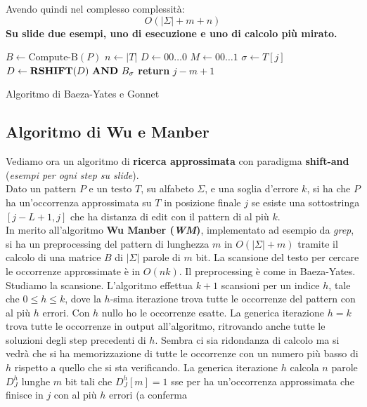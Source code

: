 \documentclass[a4paper,12pt, oneside]{book}
\begin{document}
Avendo quindi nel complesso complessità:
\[O(|\Sigma|+m+n)\]
\textbf{Su slide due esempi, uno di esecuzione e uno di calcolo più mirato.}
\begin{algorithm}
  \begin{algorithmic}
    \State $B\gets \mbox{Compute-B}(P)$
    \State $n\gets |T|$
    \State $D\gets 00\ldots 0$
    \State $M\gets 00\ldots 1$
    \State $\sigma\gets T[j]$
    \State $D\gets \mathbf{RSHIFT}(D)\mbox{ \textbf{AND} }B_\sigma$
    \State \textbf{return} $j-m+1$
    \EndIf
    \EndFor
    \EndFunction
  \end{algorithmic}
  \caption{Algoritmo di Baeza-Yates e Gonnet}
\end{algorithm}
\subsection{Algoritmo di Wu e Manber}
Vediamo ora un algoritmo di \textbf{ricerca approssimata} con paradigma
\textbf{shift-and} (\textit{esempi per ogni step su slide}).\\
Dato un pattern $P$ e un testo $T$, su alfabeto $\Sigma$, e una soglia d'errore
$k$, si ha che $P$ ha un'occorrenza approssimata su $T$ in posizione finale $j$
se esiste una sottostringa $[j-L+1,j]$ che ha distanza di edit con il pattern di
al più $k$.\\
In merito all'algoritmo \textbf{Wu Manber (\textit{WM})}, implementato ad
esempio da \textit{grep}, si ha un preprocessing del pattern di lunghezza $m$ in
$O(|\Sigma| +m)$ tramite il calcolo di una matrice $B$ di $|\Sigma|$ parole di
$m$ bit. La scansione del testo per cercare le occorrenze approssimate è in
$O(nk)$. Il preprocessing è come in Baeza-Yates.\\
Studiamo la scansione.
L'algoritmo effettua $k+1$ scansioni per un indice $h$, tale che $0\leq h\leq
k$, dove la $h$-sima iterazione trova tutte le occorrenze del pattern con al più
$h$ errori. Con $h$ nullo ho le occorrenze esatte. La generica iterazione $h=k$
trova tutte le occorrenze in output all'algoritmo, ritrovando anche tutte le
soluzioni degli step precedenti di $h$. Sembra ci sia ridondanza di calcolo ma
si vedrà che si ha memorizzazione di tutte le occorrenze con un numero più basso
di $h$ rispetto a quello che si sta verificando. La generica iterazione $h$
calcola $n$ parole $D_J^h$ lunghe $m$ bit tali che $D_J^h[m]=1$ sse per ha
un'occorrenza approssimata che finisce in $j$ con al più $h$ errori (a conferma
\end{document}
